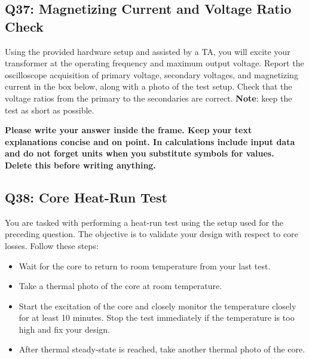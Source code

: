 \documentclass{PELsmallreport}
\begin{document}
\hfill{}






\subsection{Q37: Magnetizing Current and Voltage Ratio Check} 
Using the provided hardware setup and assisted by a TA, you will excite your transformer at the operating frequency and maximum output voltage. 
Report the oscilloscope acquisition of primary voltage, secondary voltages, and magnetizing current in the box below, along with a photo of the test setup. Check that the voltage ratios from the primary to the secondaries are correct. 
\textbf{Note}: keep the test as short as possible. 




\begin{framed}
	\vspace{2em}
	\textbf{Please write your answer inside the frame. Keep your text explanations concise and on point. In calculations include input data and do not forget units when you substitute symbols for values. \\ Delete this before writing anything.}
	\vspace{2em}
\end{framed}

\hfill {}





\subsection{Q38: Core Heat-Run Test} 
You are tasked with performing a heat-run test using the setup used for the preceding question. The objective is to validate your design with respect to core losses. Follow these steps: 
\begin{itemize}
    \item Wait for the core to return to room temperature from your last test.
    \item Take a thermal photo of the core at room temperature.
    \item Start the excitation of the core and closely monitor the temperature closely for at least 10 minutes. Stop the test immediately if the temperature is too high and fix your design.
    \item After thermal steady-state is reached, take another thermal photo of the core.  
\end{itemize}
\end{document}
